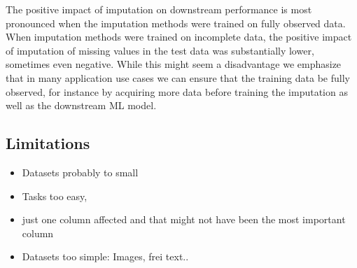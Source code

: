 The positive impact of imputation on downstream performance is most pronounced when the imputation methods were trained on fully observed data. When imputation methods were trained on incomplete data, the positive impact of imputation of missing values in the test data was substantially lower, sometimes even negative. While this might seem a disadvantage we emphasize that in many application use cases we can ensure that the training data be fully observed, for instance by acquiring more data before training the imputation as well as the downstream ML model.

\subsection{Limitations}
%

\begin{itemize}
	\item Datasets probably to small
	\item Tasks too easy,
	\item just one column affected and that might not have been the most important column
	\item Datasets too simple: Images, frei text..
\end{itemize}
